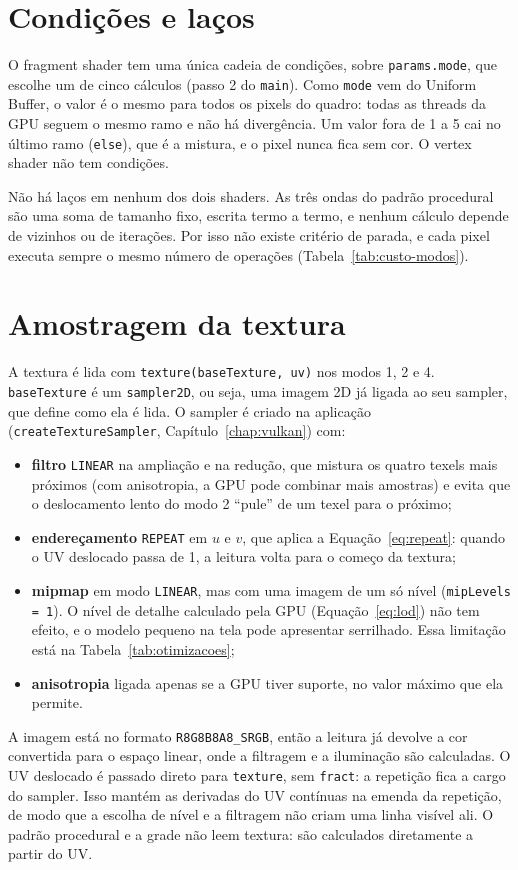 \section{Condições e laços}

O fragment shader tem uma única cadeia de condições, sobre \texttt{params.mode}, que escolhe um de cinco cálculos (passo 2 do \texttt{main}). Como \texttt{mode} vem do Uniform Buffer, o valor é o mesmo para todos os pixels do quadro: todas as threads da GPU seguem o mesmo ramo e não há divergência. Um valor fora de 1 a 5 cai no último ramo (\texttt{else}), que é a mistura, e o pixel nunca fica sem cor. O vertex shader não tem condições.

Não há laços em nenhum dos dois shaders. As três ondas do padrão procedural são uma soma de tamanho fixo, escrita termo a termo, e nenhum cálculo depende de vizinhos ou de iterações. Por isso não existe critério de parada, e cada pixel executa sempre o mesmo número de operações (Tabela~\ref{tab:custo-modos}).

\section{Amostragem da textura}

A textura é lida com \texttt{texture(baseTexture, uv)} nos modos 1, 2 e 4. \texttt{baseTexture} é um \texttt{sampler2D}, ou seja, uma imagem 2D já ligada ao seu sampler, que define como ela é lida. O sampler é criado na aplicação (\texttt{createTextureSampler}, Capítulo~\ref{chap:vulkan}) com:
\begin{itemize}
    \item \textbf{filtro} \texttt{LINEAR} na ampliação e na redução, que mistura os quatro texels mais próximos (com anisotropia, a GPU pode combinar mais amostras) e evita que o deslocamento lento do modo 2 ``pule'' de um texel para o próximo;
    \item \textbf{endereçamento} \texttt{REPEAT} em \(u\) e \(v\), que aplica a Equação~\eqref{eq:repeat}: quando o UV deslocado passa de 1, a leitura volta para o começo da textura;
    \item \textbf{mipmap} em modo \texttt{LINEAR}, mas com uma imagem de um só nível (\texttt{mipLevels = 1}). O nível de detalhe calculado pela GPU (Equação~\eqref{eq:lod}) não tem efeito, e o modelo pequeno na tela pode apresentar serrilhado. Essa limitação está na Tabela~\ref{tab:otimizacoes};
    \item \textbf{anisotropia} ligada apenas se a GPU tiver suporte, no valor máximo que ela permite.
\end{itemize}
A imagem está no formato \texttt{R8G8B8A8\_SRGB}, então a leitura já devolve a cor convertida para o espaço linear, onde a filtragem e a iluminação são calculadas.
O UV deslocado é passado direto para \texttt{texture}, sem \texttt{fract}: a repetição fica a cargo do sampler. Isso mantém as derivadas do UV contínuas na emenda da repetição, de modo que a escolha de nível e a filtragem não criam uma linha visível ali. O padrão procedural e a grade não leem textura: são calculados diretamente a partir do UV.

